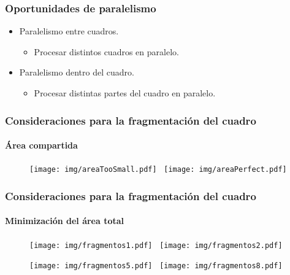 \documentclass[11pt,a4paper,spanish]{beamer}
\begin{document}
\begin{frame}

\frametitle{Oportunidades de paralelismo}

\begin{itemize}

	\item Paralelismo entre cuadros.

\begin{itemize}

	\item Procesar distintos cuadros en paralelo.

\end{itemize}

	\item Paralelismo dentro del cuadro.

\begin{itemize}

	\item Procesar distintas partes del cuadro en paralelo.

\end{itemize}

\end{itemize}

\end{frame}

\begin{frame}

\frametitle{Consideraciones para la fragmentación del cuadro}

\framesubtitle{Área compartida}

\begin{figure}[h]

	\centering

	\texttt{[image: img/areaTooSmall.pdf]}~
	\texttt{[image: img/areaPerfect.pdf]}

\end{figure}

\end{frame}

\begin{frame}

\frametitle{Consideraciones para la fragmentación del cuadro}

\framesubtitle{Minimización del área total}

\begin{figure}[h]

	\texttt{[image: img/fragmentos1.pdf]}~
	\texttt{[image: img/fragmentos2.pdf]}

	\texttt{[image: img/fragmentos5.pdf]}~
	\texttt{[image: img/fragmentos8.pdf]}

\end{figure}

\end{frame}
\end{document}
